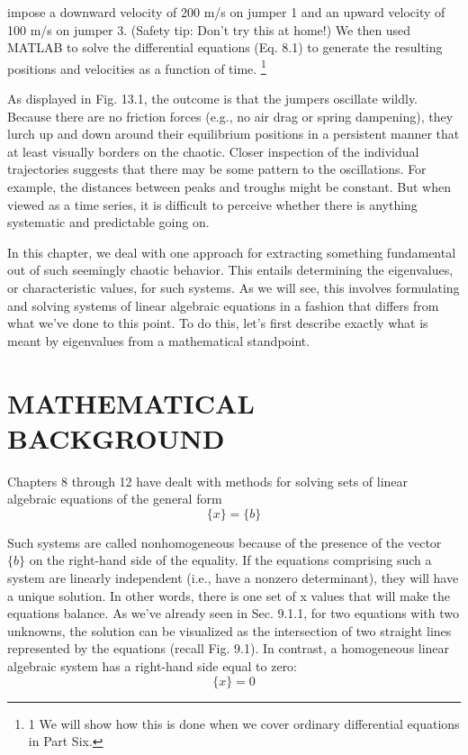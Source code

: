 \documentclass[../main.tex]{subfiles}
\begin{document}
impose a downward velocity of 200 m/s on jumper 1 and an upward velocity of 100 m/s on
jumper 3. (Safety tip: Don’t try this at home!) We then used MATLAB to solve the differential
equations (Eq. 8.1) to generate the resulting positions and velocities as a function of time.
\footnote{1 We will show how this is done when we cover ordinary differential equations in Part Six.}


As displayed in Fig. 13.1, the outcome is that the jumpers oscillate wildly. Because
there are no friction forces (e.g., no air drag or spring dampening), they lurch up and down
around their equilibrium positions in a persistent manner that at least visually borders on
the chaotic. Closer inspection of the individual trajectories suggests that there may be some
pattern to the oscillations. For example, the distances between peaks and troughs might be
constant. But when viewed as a time series, it is difficult to perceive whether there is anything systematic and predictable going on.


In this chapter, we deal with one approach for extracting something fundamental out
of such seemingly chaotic behavior. This entails determining the eigenvalues, or characteristic values, for such systems. As we will see, this involves formulating and solving systems of linear algebraic equations in a fashion that differs from what we’ve done to this
point. To do this, let’s first describe exactly what is meant by eigenvalues from a mathematical standpoint.

\section{MATHEMATICAL BACKGROUND}
Chapters 8 through 12 have dealt with methods for solving sets of linear algebraic equations of the general form
\begin{equation}
[A]\{x\}=\{b\} \tag{13.1}
\end{equation}

Such systems are called nonhomogeneous because of the presence of the vector $\{b\}$ on the
right-hand side of the equality. If the equations comprising such a system are linearly
independent (i.e., have a nonzero determinant), they will have a unique solution. In other
words, there is one set of x values that will make the equations balance. As we’ve already
seen in Sec. 9.1.1, for two equations with two unknowns, the solution can be visualized as
the intersection of two straight lines represented by the equations (recall Fig. 9.1).
In contrast, a homogeneous linear algebraic system has a right-hand side equal to zero:
\begin{equation}
[A]\{x\}=0 \tag{13.2}
\end{equation}
\end{document}
